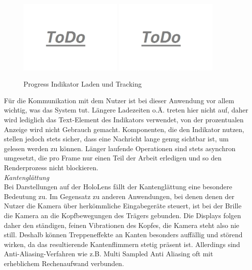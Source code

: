 \begin{figure}[H]
	\centering
	\includegraphics[width=0.45\textwidth]{images/todo.jpg}
	\hspace{0.05cm}	
	\includegraphics[width=0.45\textwidth]{images/todo.jpg}
	\caption{Progress Indikator Laden und Tracking}
	\label{img:pi-and-tracking}
\end{figure}

Für die Kommunikation mit dem Nutzer ist bei dieser Anwendung vor allem wichtig, was das System tut. Längere Ladezeiten o.Ä. treten hier nicht auf, daher wird lediglich das Text-Element des Indikators verwendet, von der prozentualen Anzeige wird nicht Gebrauch gemacht. Komponenten, die den Indikator nutzen, stellen jedoch stets sicher, dass eine Nachricht lange genug sichtbar ist, um gelesen werden zu können. Länger laufende Operationen sind stets asynchron umgesetzt, die pro Frame nur einen Teil der Arbeit erledigen und so den Renderprozess nicht blockieren.\\

\textit{Kantenglättung}\\
Bei Darstellungen auf der HoloLens fällt der Kantenglättung eine besondere Bedeutung zu. Im Gegensatz zu anderen Anwendungen, bei denen denen der Nutzer die Kamera über herkömmliche Eingabegeräte steuert, ist bei der Brille die Kamera an die Kopfbewegungen des Trägers gebunden. Die Displays folgen daher den ständigen, feinen Vibrationen des Kopfes, die Kamera steht also nie still. Deshalb können Treppeneffekte an Kanten besonders auffällig und störend wirken, da das resultierende Kantenflimmern stetig präsent ist. Allerdings sind Anti-Aliasing-Verfahren wie z.B. Multi Sampled Anti Aliasing oft mit erheblichem Rechenaufwand verbunden.\\ %

